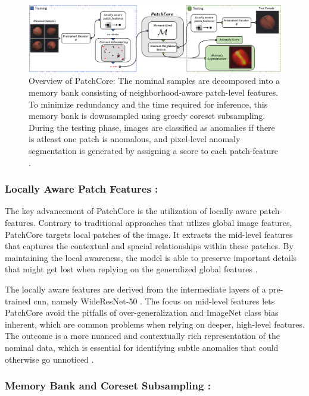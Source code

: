 \begin{figure}[ht!]
    \centering
    \includegraphics[width=1.1\textwidth]{Rohit_Master_Thesis//Images/patchcore_architecture_figure.png}
    \caption{Overview of PatchCore: The nominal samples are decomposed into a memory bank consisting of neighborhood-aware patch-level features. To minimize redundancy and the time required for inference, this memory bank is downsampled using greedy coreset subsampling. During the testing phase, images are classified as anomalies if there is atleast one patch is anomalous, and pixel-level anomaly segmentation is generated by assigning a score to each patch-feature \cite{roth2022totalrecallindustrialanomaly}.}
    \label{fig:patchcore architecture}
\end{figure}

\subsubsection*{Locally Aware Patch Features :} 
The key advancement of PatchCore is the utilization of locally aware patch-features. Contrary to traditional approaches that utlizes global image features, PatchCore targets local patches of the image. It extracts the mid-level features that captures the contextual and spacial relationships within these patches. By maintaining the local awareness, the model is able to preserve important details that might get lost when replying on the generalized global features \cite{roth2022totalrecallindustrialanomaly}.

The locally aware features are derived from the intermediate layers of a pre-trained \gls{cnn}, namely WideResNet-50 \cite{zagoruyko2017wideresidualnetworks}. The focus on mid-level features lets PatchCore avoid the pitfalls of over-generalization and ImageNet class bias inherent, which are common problems when relying on deeper, high-level features. The outcome is a more nuanced and contextually rich representation of the nominal data, which is essential for identifying subtle anomalies that could otherwise go unnoticed \cite{roth2022totalrecallindustrialanomaly}.

\subsubsection*{Memory Bank and Coreset Subsampling :}

